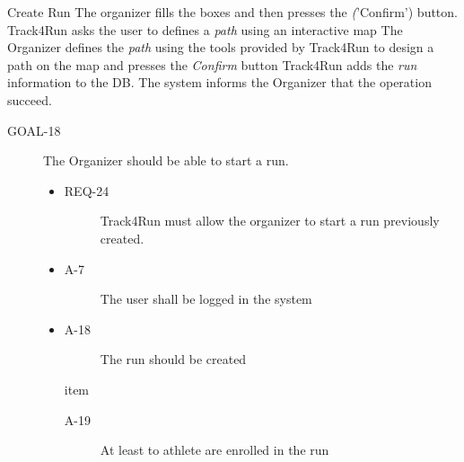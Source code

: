 \documentclass[a4paper]{article}
\newcommand{\requirement}{\ding{229}}%
\begin{document}
         \begin{usecase}{Create Run}
              {The organizer fills the boxes and then presses the \textit('Confirm') button.}
              {Track4Run asks the user to defines a \textit{path} using an interactive map}
              {The Organizer defines the \textit{path} using the tools provided by Track4Run to design a path on the map and presses the \textit{Confirm} button}
              {Track4Run adds the \textit{run} information to the DB.}
              {The system informs the Organizer that the operation succeed.}
        \end{usecase}
        
        
        \begin{description}
        	\item[GOAL-18] The Organizer should be able to start a run.
            	\begin{itemize}
            	    \item[\requirement]
                	\begin{description}
                	\item[REQ-24] Track4Run must allow the organizer to start a run previously created.
                	\end{description}
                	\item
                	\begin{description}
                	\item[A-7] The user shall be logged in the system         \end{description}
                	\item
                	\begin{description}
                	\item[A-18] The run should be created  
                	\end{description}
                	item
                	\begin{description}
                	\item[A-19] At least to athlete are enrolled in the run
                	\end{description}
                	\end{itemize}
        \end{description}
        
\end{document}

